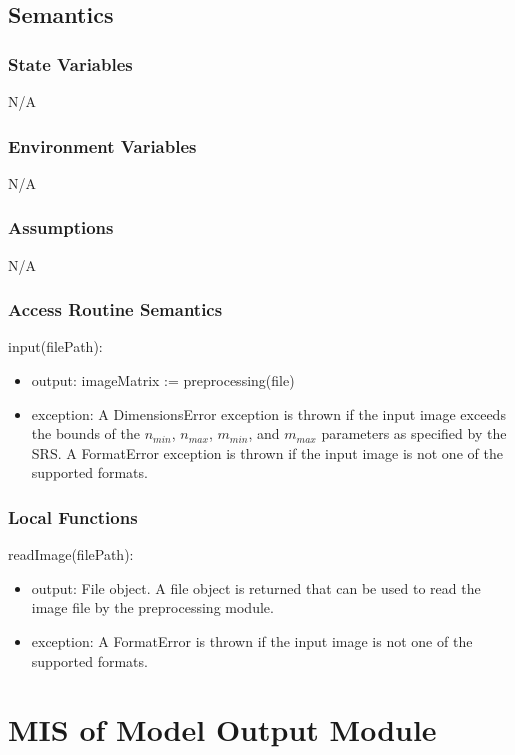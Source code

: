 \documentclass[12pt, titlepage]{article}
\begin{document}
\subsection{Semantics}

\subsubsection{State Variables}

N/A

\subsubsection{Environment Variables}

N/A

\subsubsection{Assumptions}

N/A

\subsubsection{Access Routine Semantics}

\noindent input(filePath):
\begin{itemize} 
\item output: imageMatrix := preprocessing(file)
\item exception: A DimensionsError exception is thrown if the input image
exceeds the bounds of the $n_{min}$, $n_{max}$, $m_{min}$, and $m_{max}$
parameters as specified by the SRS. A FormatError exception is thrown if the
input image is not one of the supported formats.
\end{itemize}

\subsubsection{Local Functions}

\noindent readImage(filePath):
\begin{itemize} 
\item output: File object. A file object is returned that can be used to
read the image file by the preprocessing module.
\item exception: A FormatError is thrown if the input image is not one of the
supported formats.
\end{itemize}

\section{MIS of Model Output Module} \label{MOutput}
\end{document}
